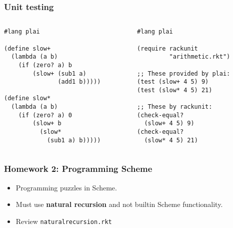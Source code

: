\documentclass{beamer}
\newcommand{\bi}{\begin{itemize}}
\newcommand{\li}{\item}
\newcommand{\ei}{\end{itemize}}
\newcommand{\bfr}[1]{\begin{frame}[fragile]\frametitle{{ #1 }}}
\newcommand{\cola}{\begin{columns}\begin{column}{0.5\textwidth}}
\newcommand{\colb}{\end{column}\begin{column}{0.5\textwidth}}
\newcommand{\colc}{\end{column}\end{columns}}
\begin{document}
\bfr{Unit testing}
\cola
\begin{lstlisting}[title=arithmetic.rkt]
#lang plai

(define slow+
  (lambda (a b)
    (if (zero? a) b
        (slow+ (sub1 a)
               (add1 b)))))

(define slow*
  (lambda (a b)
    (if (zero? a) 0
        (slow+ b 
          (slow* 
            (sub1 a) b)))))

\end{lstlisting}
\colb
\begin{lstlisting}[title=arithmetic-test.rkt]
#lang plai

(require rackunit
         "arithmetic.rkt")

;; These provided by plai:
(test (slow+ 4 5) 9)
(test (slow* 4 5) 21)

;; These by rackunit:
(check-equal?
  (slow+ 4 5) 9)
(check-equal?
  (slow* 4 5) 21)

\end{lstlisting}
\colc
\end{frame}
\bfr{Homework 2:  Programming Scheme}
\bi
\li Programming puzzles in Scheme.
\li Must use {\bf natural recursion} and not builtin Scheme functionality.
\li Review {\tt naturalrecursion.rkt}
\ei
\end{frame}
\end{document}
